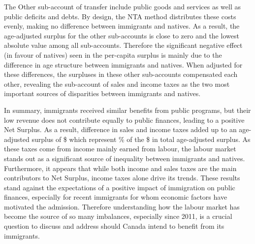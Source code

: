 \vspace{0.7em}\par
The Other sub-account of transfer include public goods and services as well as public deficits and debts.
By design, the NTA method distributes these costs evenly, making no difference between immigrants and natives.
As a result, the age-adjusted surplus for the other sub-accounts is close to zero and the lowest absolute value among all sub-accounts.
Therefore the significant negative effect (in favour of natives) seen in the per-capita surplus is mainly due to the difference in age structure between immigrants and natives.
When adjusted for these differences, the surpluses in these other sub-accounts compensated each other, revealing the sub-account of sales and income taxes as the two most important sources of disparities between immigrants and natives.

\vspace{0.7em}\par
In summary, immigrants received similar benefits from public programs, but their low revenue does not contribute equally to public finances, leading to a positive Net Surplus.
As a result, difference in sales and income taxes added up to an age-adjusted surplus of \$ which  represent \% of the \$ in total age-adjusted surplus.
As these taxes come from income mainly earned from labour, the labour market stands out as a significant source of inequality between immigrants and natives.
Furthermore, it appears that while both income and sales taxes are the main contributors to Net Surplus, income taxes alone drive its trends.
These results stand against the expectations of a positive impact of immigration on public finances, especially for recent immigrants for whom economic factors have motivated the admission.
Therefore understanding how the labour market has become the source of so many imbalances, especially since 2011, is a crucial question to discuss and address should Canada intend to benefit from its immigrants.


















